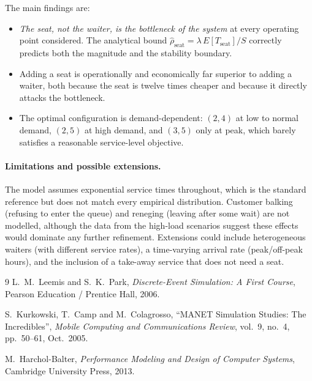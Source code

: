 \documentclass[11pt,a4paper]{article}
\begin{document}
The main findings are:
\begin{itemize}
\item \emph{The seat, not the waiter, is the bottleneck of the system}
at every operating point considered. The analytical bound
$\hat\rho_{\text{seat}} = \lambda\,E[T_{\text{seat}}]/S$ correctly
predicts both the magnitude and the stability boundary.
\item Adding a seat is operationally and economically far superior to
adding a waiter, both because the seat is twelve times cheaper and
because it directly attacks the bottleneck.
\item The optimal configuration is demand-dependent: $(2,4)$ at low
to normal demand, $(2,5)$ at high demand, and $(3,5)$ only at peak,
which barely satisfies a reasonable service-level objective.
\end{itemize}

\paragraph{Limitations and possible extensions.}
The model assumes exponential service times throughout, which is the
standard reference but does not match every empirical distribution.
Customer balking (refusing to enter the queue) and reneging (leaving
after some wait) are not modelled, although the data from the high-load
scenarios suggest these effects would dominate any further refinement.
Extensions could include heterogeneous waiters (with different service
rates), a time-varying arrival rate (peak/off-peak hours), and the
inclusion of a take-away service that does not need a seat.

\begin{thebibliography}{9}
L.~M.~Leemis and S.~K.~Park,
\emph{Discrete-Event Simulation: A First Course},
Pearson Education / Prentice Hall, 2006.

S.~Kurkowski, T.~Camp and M.~Colagrosso,
``MANET Simulation Studies: The Incredibles'',
\emph{Mobile Computing and Communications Review}, vol.~9, no.~4,
pp.~50--61, Oct.~2005.

M.~Harchol-Balter,
\emph{Performance Modeling and Design of Computer Systems},
Cambridge University Press, 2013.
\end{thebibliography}
\end{document}
